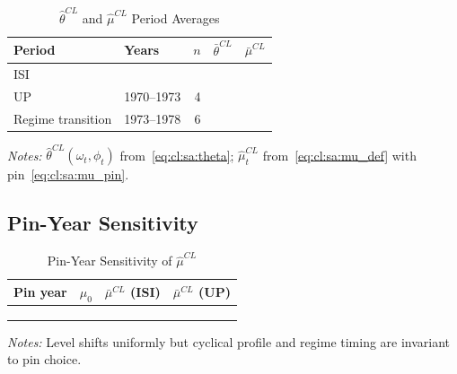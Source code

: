 \begin{table}[htbp]
\centering
\caption{$\hat{\theta}^{CL}$ and $\hat{\mu}^{CL}$ Period Averages}
\label{tab:cl:sa:mu_periods}
\begin{threeparttable}
\begin{tabular}{llrrr}
\toprule
Period & Years & $n$ & $\bar{\theta}^{CL}$ & $\bar{\mu}^{CL}$ \\
\midrule
ISI     &  &  &  &  \\
UP      & 1970--1973 & 4 &  &  \\
Regime transition & 1973--1978 & 6 &  &  \\
\bottomrule
\end{tabular}
\begin{tablenotes}
\small
\item \textit{Notes:}
$\hat{\theta}^{CL}(\omega_t, \phi_t)$
from~\eqref{eq:cl:sa:theta};
$\hat{\mu}_t^{CL}$ from~\eqref{eq:cl:sa:mu_def} with
pin~\eqref{eq:cl:sa:mu_pin}.
\end{tablenotes}
\end{threeparttable}
\end{table}


\subsection{Pin-Year Sensitivity}
\label{app:cl:pin_sensitivity}

\begin{table}[htbp]
\centering
\caption{Pin-Year Sensitivity of $\hat{\mu}^{CL}$}
\label{tab:cl:sa:mu_pin_sensitivity}
\begin{threeparttable}
\begin{tabular}{lrrr}
\toprule
Pin year & $\mu_0$ & $\bar{\mu}^{CL}$ (ISI)
& $\bar{\mu}^{CL}$ (UP) \\
\midrule
&  &  &  \\
&  &  &  \\
&  &  &  \\
\bottomrule
\end{tabular}
\begin{tablenotes}
\small
\item \textit{Notes:} Level shifts uniformly but cyclical
profile and regime timing are invariant to pin choice.
\end{tablenotes}
\end{threeparttable}
\end{table}


